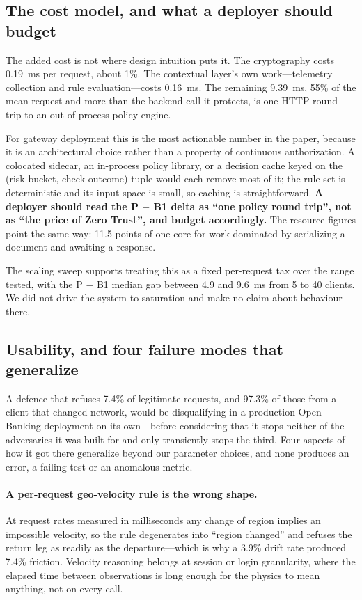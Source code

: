 \subsection{The cost model, and what a deployer should budget}

The added cost is not where design intuition puts it. The cryptography costs 0.19~ms per request, about 1\%. The contextual layer's own work---telemetry collection and rule evaluation---costs 0.16~ms. The remaining 9.39~ms, 55\% of the mean request and more than the backend call it protects, is one HTTP round trip to an out-of-process policy engine.

For gateway deployment this is the most actionable number in the paper, because it is an architectural choice rather than a property of continuous authorization. A colocated sidecar, an in-process policy library, or a decision cache keyed on the (risk bucket, check outcome) tuple would each remove most of it; the rule set is deterministic and its input space is small, so caching is straightforward. \textbf{A deployer should read the P $-$ B1 delta as ``one policy round trip'', not as ``the price of Zero Trust'', and budget accordingly.} The resource figures point the same way: 11.5 points of one core for work dominated by serializing a document and awaiting a response.

The scaling sweep supports treating this as a fixed per-request tax over the range tested, with the P $-$ B1 median gap between 4.9 and 9.6~ms from 5 to 40 clients. We did not drive the system to saturation and make no claim about behaviour there.

\subsection{Usability, and four failure modes that generalize}
\label{sec:disc-usability}

A defence that refuses 7.4\% of legitimate requests, and 97.3\% of those from a client that changed network, would be disqualifying in a production Open Banking deployment on its own---before considering that it stops neither of the adversaries it was built for and only transiently stops the third. Four aspects of how it got there generalize beyond our parameter choices, and none produces an error, a failing test or an anomalous metric.

\paragraph{A per-request geo-velocity rule is the wrong shape.} At request rates measured in milliseconds any change of region implies an impossible velocity, so the rule degenerates into ``region changed'' and refuses the return leg as readily as the departure---which is why a 3.9\% drift rate produced 7.4\% friction. Velocity reasoning belongs at session or login granularity, where the elapsed time between observations is long enough for the physics to mean anything, not on every call.

